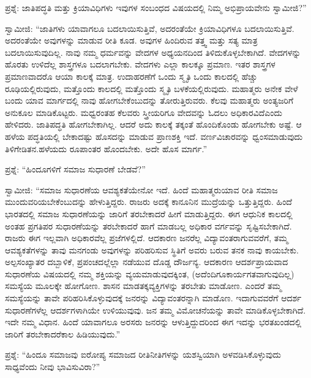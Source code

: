 ಪ್ರಶ್ನೆ: ಜಾತಿಪದ್ಧತಿ ಮತ್ತು ಕ್ರಿಯಾವಿಧಿಗಳು ಇವುಗಳ ಸಂಬಂಧದ ವಿಷಯದಲ್ಲಿ ನಿಮ್ಮ ಅಭಿಪ್ರಾಯವೇನು ಸ್ವಾಮೀಜಿ?”

ಸ್ವಾಮೀಜಿ: “ಜಾತಿಗಳು ಯಾವಾಗಲೂ ಬದಲಾಯಿಸುತ್ತಿವೆ, ಅದರಂತೆಯೇ ಕ್ರಿಯಾವಿಧಿಗಳೂ ಬದಲಾಯಿಸುತ್ತಿವೆ. ಅದರಂತೆಯೇ ಅವುಗಳನ್ನು ಮಾಡುವ ರೀತಿ ಕೂಡ. ಅವುಗಳ ಹಿಂದಿರುವ ತತ್ತ್ವ ಮತ್ತು ಸತ್ಯ ಮಾತ್ರ ಬದಲಾಯಿಸುವುದಿಲ್ಲ. ನಾವು ನಮ್ಮ ಧರ್ಮವನ್ನು ವೇದಗಳ ಅಧ್ಯಯನದಿಂದ ತಿಳಿದುಕೊಳ್ಳಬೇಕಾಗಿದೆ. ವೇದಗಳನ್ನು ಹೊರತು ಉಳಿದೆಲ್ಲ ಶಾಸ್ತ್ರಗಳೂ ಬದಲಾಗಬೇಕು. ವೇದಗಳು ಎಲ್ಲಾ ಕಾಲಕ್ಕೂ ಪ್ರಮಾಣ. ಇತರ ಶಾಸ್ತ್ರಗಳ ಪ್ರಮಾಣವಾದರೊ ಆಯಾ ಕಾಲಕ್ಕೆ ಮಾತ್ರ. ಉದಾಹರಣೆಗೆ ಒಂದು ಸ್ಮೃತಿ ಒಂದು ಕಾಲದಲ್ಲಿ ಹೆಚ್ಚು ರೂಢಿಯಲ್ಲಿರುವುದು, ಮತ್ತೊಂದು ಕಾಲದಲ್ಲಿ ಮತ್ತೊಂದು ಸ್ಮೃತಿ ಬಳಕೆಯಲ್ಲಿರುವುದು. ಮಹಾತ್ಮರು ಅನೇಕ ವೇಳೆ ಬಂದು ಯಾವ ಮಾರ್ಗದಲ್ಲಿ ನಾವು ಹೋಗಬೇಕೆಂಬುದನ್ನು ತೋರುತ್ತಿರುವರು. ಕೆಲವು ಮಹಾತ್ಮರು ಅಂತ್ಯಜರಿಗೆ ಅನುಕೂಲ ಮಾಡಿಕೊಟ್ಟರು. ಮಧ್ವರಂತಹ ಕೆಲವರು ಸ್ತ್ರೀಯರಿಗೂ ವೇದವನ್ನು ಓದಲು ಅಧಿಕಾರವಿದೆ\break ಎಂದು ಹೇಳಿದರು. ಜಾತಿಪದ್ಧತಿ ಹೋಗಬೇಕಾಗಿಲ್ಲ. ಆದರೆ ಅದು ಕಾಲಕ್ಕೆ ತಕ್ಕಂತೆ ಹೊಂದಿಕೊಂಡು ಹೋಗಬೇಕು ಅಷ್ಟೆ. ಆ ಹಳೆಯ ಪದ್ಧತಿಯಲ್ಲಿ ಬೇಕಾದಷ್ಟು ಹೊಸದನ್ನು ಮಾಡುವ ಪ್ರಾಣಶಕ್ತಿ ಇದೆ. ವರ್ಣವಿಚಾರವನ್ನು ಧ್ವಂಸಮಾಡುವುದು ತಿಳಿಗೇಡಿತನ.\break ಹಳೆಯದು ರೂಪಾಂತರ ಹೊಂದಬೇಕು. ಅದೇ ಹೊಸ ಮಾರ್ಗ.”

ಪ್ರಶ್ನೆ: “ಹಿಂದೂಗಳಿಗೆ ಸಮಾಜ ಸುಧಾರಣೆ ಬೇಡವೆ?”

ಸ್ವಾಮೀಜಿ: “ಸಮಾಜ ಸುಧಾರಣೆಯ ಆವಶ್ಯಕತೆಯೇನೋ ಇದೆ. ಹಿಂದೆ ಮಹಾತ್ಮರು\break ಯಾವ ರೀತಿ ಸಮಾಜ ಮುಂದುವರಿಯಬೇಕೆಂಬುದನ್ನು ಹೇಳುತ್ತಿದ್ದರು. ರಾಜರು ಅದಕ್ಕೆ ಕಾನೂನಿನ ಮುದ್ರೆಯನ್ನು ಒತ್ತುತ್ತಿದ್ದರು. ಹಿಂದೆ ಭಾರತದಲ್ಲಿ ಸಮಾಜ ಸುಧಾರಣೆಯನ್ನು ಜಾರಿಗೆ ತರಬೇಕಾದರೆ ಹೀಗೆ ಮಾಡುತ್ತಿದ್ದರು. ಈಗ ಆಧುನಿಕ ಕಾಲದಲ್ಲಿ ಅಂತಹ ಪ್ರಗತಿಪರ ಸುಧಾರಣೆಯನ್ನು ತರಬೇಕಾದರೆ ಹಾಗೆ ಮಾಡಬಲ್ಲ ಅಧಿಕಾರ ವರ್ಗವನ್ನು ಸೃಷ್ಟಿಸಬೇಕಾಗಿದೆ. ರಾಜರು ಈಗ ಇಲ್ಲವಾಗಿ ಅಧಿಕಾರವೆಲ್ಲ ಪ್ರಜೆಗಳಲ್ಲಿದೆ. ಆದಕಾರಣ ಜನರೆಲ್ಲ ವಿದ್ಯಾವಂತರಾಗುವವರೆಗೆ, ತಮ್ಮ ಆವಶ್ಯಕತೆಗಳನ್ನು ತಾವು ಮನಗಂಡು ಅವುಗಳನ್ನು ಪರಿಹರಿಸುವ ಸ್ಥಿತಿಗೆ ಅವರು ಬರುವ ತನಕ ನಾವು ಕಾಯಬೇಕು. ಅಲ್ಪಸಂಖ್ಯಾತರ ದಬ್ಬಾಳಿಕೆ, ಪ್ರಪಂಚದಲ್ಲೆಲ್ಲಾ ನಡೆಯುವ ದೊಡ್ಡ ದೌರ್ಜನ್ಯ. ಆದಕಾರಣ ಆದರ್ಶಪ್ರಾಯವಾದ ಸುಧಾರಣೆಯ ವಿಷಯದಲ್ಲಿ ನಮ್ಮ ಶಕ್ತಿಯನ್ನು ವ್ಯಯಮಾಡುವುದಕ್ಕಿಂತ, (ಅದೆಂದಿಗೂ\break ಕಾರ್ಯಗತವಾಗುವುದಿಲ್ಲ) ಸಮಸ್ಯೆಯ ಮೂಲಕ್ಕೇ ಹೋಗೋಣ. ಶಾಸನ ಮಾಡತಕ್ಕ\break ವ್ಯಕ್ತಿಗಳನ್ನು ತರಬೇತು ಮಾಡೋಣ. ಎಂದರೆ ತಮ್ಮ ಸಮಸ್ಯೆಯನ್ನು ತಾವೇ ಪರಿಹರಿಸಿಕೊಳ್ಳುವುದಕ್ಕೆ ಜನರನ್ನು ವಿದ್ಯಾವಂತರನ್ನಾಗಿ ಮಾಡೊಣ. ಇದಾಗುವವರೆಗೆ ಆದರ್ಶ ಸುಧಾರಣೆಗಳೆಲ್ಲ ಆದರ್ಶಗಳಾಗಿಯೇ ಉಳಿಯುವುವು. ಜನ ತಮ್ಮ ವಿಮೋಚನೆಯನ್ನು ತಾವೇ ಮಾಡಿಕೊಳ್ಳಬೇಕಾಗಿದೆ. ಇದೇ ನಮ್ಮ ವಿಧಾನ. ಹಿಂದೆ ಯಾವಾಗಲೂ ಅರಸರು ಜನರನ್ನು ಆಳುತ್ತಿದ್ದುದರಿಂದ ಈಗ ಇದನ್ನು ಭರತಖಂಡದಲ್ಲಿ ಜಾರಿಗೆ ತರಬೇಕಾದರೆ\break ಕಾಲ ಹಿಡಿಯುವುದು.”

ಪ್ರಶ್ನೆ: “ಹಿಂದೂ ಸಮಾಜವು ಐರೋಪ್ಯ ಸಮಾಜದ ರೀತಿನೀತಿಗಳನ್ನು ಯಶಸ್ವಿಯಾಗಿ ಅಳವಡಿಸಿಕೊಳ್ಳುವುದು ಸಾಧ್ಯವೆಂದು ನೀವು ಭಾವಿಸುವಿರಾ?”

